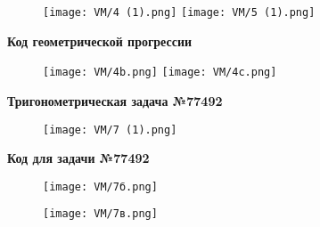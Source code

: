 	\begin{figure}[h]
		\centering
		\texttt{[image: VM/4 (1).png]}
		\texttt{[image: VM/5 (1).png]}
	\end{figure}
	
\textbf{Код геометрической прогрессии}

\newpage

\begin{figure}[h]
		\centering
		\texttt{[image: VM/4b.png]}
		\texttt{[image: VM/4c.png]}
	\end{figure}
	
\newpage

\textbf{Тригонометрическая задача №77492}

	\begin{figure}[h]
		\centering
		\texttt{[image: VM/7 (1).png]}
	\end{figure}

\textbf{Код для задачи №77492}

\begin{figure}[h]
		\centering
		\texttt{[image: VM/7б.png]}
\end{figure}
			
\begin{figure}[h]
		\centering
		\texttt{[image: VM/7в.png]}
\end{figure}
